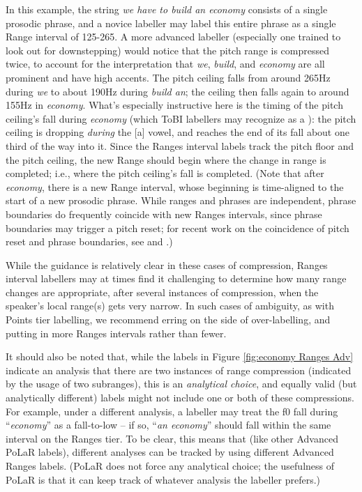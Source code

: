 \documentclass[11pt, twoside]{memoir}
\def\textlabel#1{{\relsize{-.5}\fontspec[Mapping=tex-text]{Roboto Mono}{#1}}}
\def\langtext#1{\textit{#1}}
\begin{document}
In this example, the string \langtext{we have to build an economy} consists of a single prosodic phrase, and a novice labeller may label this entire phrase as a single Range interval of 125-265. A more advanced labeller (especially one trained to look out for downstepping) would notice that the pitch range is compressed twice, to account for the interpretation that \langtext{we}, \langtext{build}, and \langtext{economy} are all prominent and have high accents. The pitch ceiling falls from around 265Hz during \langtext{we} to about 190Hz during \langtext{build an}; the ceiling then falls again to around 155Hz in \langtext{economy}. What’s especially instructive here is the timing of the pitch ceiling’s fall during \langtext{economy} (which ToBI labellers may recognize as a \textlabel{H+!H*}): the pitch ceiling is dropping \textit{during} the [a] vowel, and reaches the end of its fall about one third of the way into it. Since the Ranges interval labels track the pitch floor and the pitch ceiling, the new Range should begin where the change in range is completed; i.e., where the pitch ceiling’s fall is completed. (Note that after \langtext{economy}, there is a new Range interval, whose beginning is time-aligned to the start of a new prosodic phrase. While ranges and phrases are independent, phrase boundaries do frequently coincide with new Ranges intervals, since phrase boundaries may trigger a pitch reset; for recent work on the coincidence of pitch reset and phrase boundaries, see \citealt{brugos15} and \citealt{kim20}.)

While the guidance is relatively clear in these cases of compression, Ranges interval labellers may at times find it challenging to determine how many range changes are appropriate, after several instances of compression, when the speaker’s local range(s) gets very narrow. In such cases of ambiguity, as with Points tier labelling, we recommend erring on the side of over-labelling, and putting in more Ranges intervals rather than fewer.

It should also be noted that, while the labels in Figure \ref{fig:economy Ranges Adv} indicate an analysis that there are two instances of range compression (indicated by the usage of two subranges), this is an \emph{analytical choice}, and equally valid (but analytically different) labels might not include one or both of these compressions. For example, under a different analysis, a labeller may treat the f0 fall during “\langtext{economy}” as a fall-to-low – if so, “\langtext{an economy}” should fall within the same interval on the Ranges tier. To be clear, this means that (like other Advanced PoLaR labels), different analyses can be tracked by using different Advanced Ranges labels. (PoLaR does not force any analytical choice; the usefulness of PoLaR is that it can keep track of whatever analysis the labeller prefers.)
\end{document}
